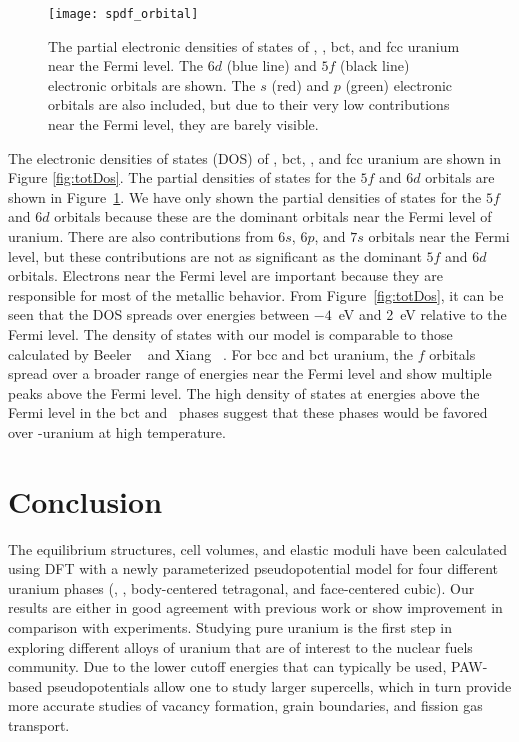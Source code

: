 \begin{figure}
	\centering
	\texttt{[image: spdf\_orbital]}
    \caption[The partial electronic densities of states of \textalpha,
      \textgamma, bct, and fcc uranium near the Fermi level.]{The partial electronic densities of states of \textalpha,
      \textgamma, bct, and fcc uranium near the Fermi level. The $6d$ (blue
      line) and $5f$ (black line) electronic orbitals are shown. The $s$ (red)
      and $p$ (green) electronic orbitals are also included, but due to their
      very low contributions near the Fermi level, they are barely visible.}
	\label{fig:fdorbitals}
\end{figure}

The electronic densities of states (DOS) of \textalpha, bct, \textgamma, and
fcc uranium are shown in Figure \ref{fig:totDos}. The partial densities of
states for the $5f$ and $6d$ orbitals are shown in Figure~\ref{fig:fdorbitals}.
We have only shown the partial densities of states for the $5f$ and $6d$
orbitals because these are the dominant orbitals near the Fermi level of
uranium. There are also contributions from $6s$, $6p$, and $7s$ orbitals near
the Fermi level, but these contributions are not as significant as the dominant
$5f$ and $6d$ orbitals.
Electrons near the Fermi level
are important because they are responsible for most of the metallic behavior.
From Figure~\ref{fig:totDos}, it can be seen that the DOS spreads over energies
between $-4$~eV and 2~eV relative to the Fermi level. The density of states
with our model is comparable to those calculated by Beeler
\etal~\cite{beeler2013first} and Xiang \etal~\cite{xiang2008quantum}.
For bcc and bct uranium, the $f$ orbitals spread over a broader range of
energies near the Fermi level and show multiple peaks above the Fermi level.
The high density of states at energies above the Fermi level in the bct
and \textgamma\ phases suggest that these phases would be favored over
\textalpha-uranium at high temperature.

\section{Conclusion}
The equilibrium structures, cell volumes, and elastic moduli have been
calculated using DFT with a newly parameterized pseudopotential model for four
different uranium phases (\textalpha, \textgamma, body-centered
tetragonal, and face-centered cubic). Our results are either in good agreement
with previous work or show improvement in comparison with experiments.
Studying pure uranium is the first step in exploring different alloys of
uranium that are of interest to the nuclear fuels community.
Due to the lower cutoff energies that can typically be used, PAW-based
pseudopotentials allow one to study larger supercells, which in turn provide
more accurate studies of vacancy formation, grain boundaries, and fission gas
transport.

